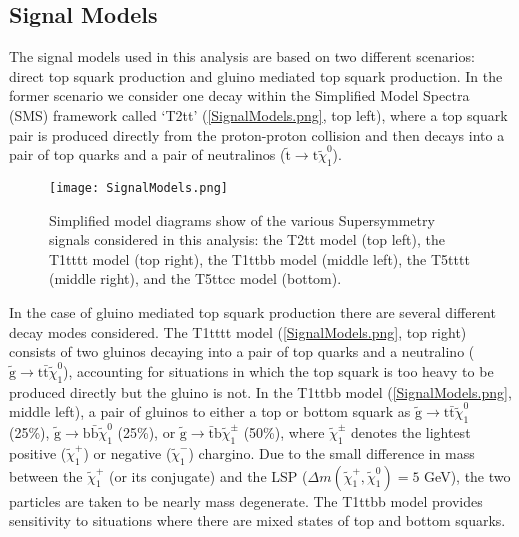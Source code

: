 \subsection{Signal Models}

The signal models used in this analysis are based on two different scenarios: direct top squark production and gluino mediated top squark production. In the former scenario we consider one decay within the Simplified Model Spectra (SMS)\cite{SMS} framework called `T2tt' (\autoref{SignalModels.png}, top left), where a top squark pair is produced directly from the proton-proton collision and then decays into a pair of top quarks and a pair of neutralinos ($\tilde{\text{t}}\rightarrow\text{t}\tilde{\chi}_{1}^{0}$).\\

\begin{figure}[H]
\begin{center}
\texttt{[image: SignalModels.png]} 
\caption{Simplified model diagrams show of the various Supersymmetry signals considered in this analysis: the T2tt model (top left), the T1tttt model (top right), the T1ttbb model (middle left), the T5tttt (middle right), and the T5ttcc model (bottom).}
\label{SignalModels.png} 
\end{center}
\end{figure}

In the case of gluino mediated top squark production there are several different decay modes considered. The T1tttt model (\autoref{SignalModels.png}, top right) consists of two gluinos decaying into a pair of top quarks and a neutralino ($\tilde{\text{g}}\rightarrow\text{t}\bar{\text{t}}\tilde{\chi}_{1}^{0}$), accounting for situations in which the top squark is too heavy to be produced directly but the gluino is not. In the T1ttbb model (\autoref{SignalModels.png}, middle left), a pair of gluinos to either a top or bottom squark as $\tilde{\text{g}}\rightarrow\text{t}\bar{\text{t}}\tilde{\chi}_{1}^{0}$ (25\%), $\tilde{\text{g}}\rightarrow\text{b}\bar{\text{b}}\tilde{\chi}_{1}^{0}$ (25\%), or $\tilde{\text{g}}\rightarrow\bar{\text{t}}\text{b}\tilde{\chi}_{1}^{\pm}$ (50\%), where $\tilde{\chi}_{1}^{\pm}$ denotes the lightest positive ($\tilde{\chi}_{1}^{+}$) or negative ($\tilde{\chi}_{1}^{-}$) chargino. Due to the small difference in mass between the $\tilde{\chi}_{1}^{+}$ (or its conjugate) and the LSP ($\Delta m(\tilde{\chi}_{1}^{+},\tilde{\chi}_{1}^{0}) = 5$ GeV), the two particles are taken to be nearly mass degenerate. The T1ttbb model provides sensitivity to situations where there are mixed states of top and bottom squarks.\\

